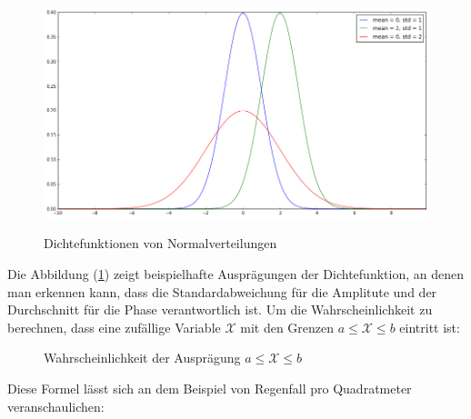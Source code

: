             \begin{figure}[H]
                    \begin{center}
                        \includegraphics[scale=0.4]{../pictures/diagrams/normal-dist-example.png}\\
                        \caption{Dichtefunktionen von Normalverteilungen}\label{fig:norm-dist-pdf}
                    \end{center}
            \end{figure}

            \noindent
            Die Abbildung (\ref{fig:norm-dist-pdf}) zeigt beispielhafte Ausprägungen der Dichtefunktion, an denen man erkennen kann, dass die Standardabweichung für die Amplitute und der Durchschnitt für die Phase verantwortlich ist. Um die Wahrscheinlichkeit zu berechnen, dass eine zufällige Variable $\mathcal{X}$  mit den Grenzen $a \leq \mathcal{X} \leq b$ eintritt ist:

            \begin{figure}[H]
                \begin{mdframed}
                    \hspace*{40mm} 
                \end{mdframed}
                \caption{Wahrscheinlichkeit der Ausprägung $a \leq \mathcal{X} \leq b$}
            \end{figure}

            \noindent
            Diese Formel lässt sich an dem Beispiel von Regenfall pro Quadratmeter veranschaulichen:

